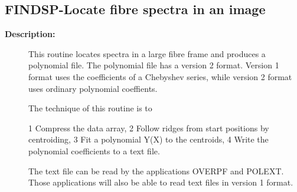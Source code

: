 \subsection{FINDSP-\label{FINDSP}Locate fibre spectra in an image}
\begin{description}

\item [{\bf Description:}]
 This routine locates spectra in a large fibre frame and produces a
 polynomial file. The polynomial file has a version 2 format.
 Version 1 format uses the coefficients of a Chebyshev series,
 while version 2 format uses ordinary polynomial coeffients.

 The technique of this routine is to

    1 Compress the data array,
    2 Follow ridges from start positions by centroiding,
    3 Fit a polynomial Y(X) to the centroids,
    4 Write the polynomial coefficients to a text file.

 The text file can be read by the applications OVERPF and POLEXT.
 Those applications will also be able to read text files in version
 1 format.


\end{description}
